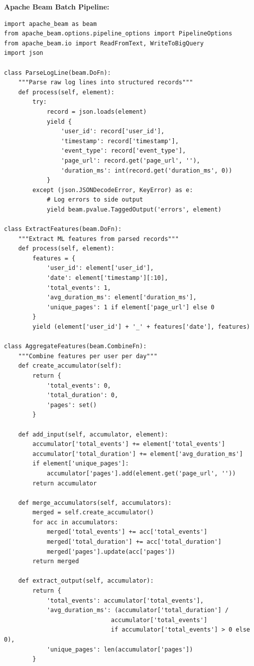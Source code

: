 \textbf{Apache Beam Batch Pipeline:}

\begin{lstlisting}[style=python, caption=Apache Beam batch processing pipeline]
import apache_beam as beam
from apache_beam.options.pipeline_options import PipelineOptions
from apache_beam.io import ReadFromText, WriteToBigQuery
import json

class ParseLogLine(beam.DoFn):
    """Parse raw log lines into structured records"""
    def process(self, element):
        try:
            record = json.loads(element)
            yield {
                'user_id': record['user_id'],
                'timestamp': record['timestamp'],
                'event_type': record['event_type'],
                'page_url': record.get('page_url', ''),
                'duration_ms': int(record.get('duration_ms', 0))
            }
        except (json.JSONDecodeError, KeyError) as e:
            # Log errors to side output
            yield beam.pvalue.TaggedOutput('errors', element)

class ExtractFeatures(beam.DoFn):
    """Extract ML features from parsed records"""
    def process(self, element):
        features = {
            'user_id': element['user_id'],
            'date': element['timestamp'][:10],
            'total_events': 1,
            'avg_duration_ms': element['duration_ms'],
            'unique_pages': 1 if element['page_url'] else 0
        }
        yield (element['user_id'] + '_' + features['date'], features)

class AggregateFeatures(beam.CombineFn):
    """Combine features per user per day"""
    def create_accumulator(self):
        return {
            'total_events': 0,
            'total_duration': 0,
            'pages': set()
        }

    def add_input(self, accumulator, element):
        accumulator['total_events'] += element['total_events']
        accumulator['total_duration'] += element['avg_duration_ms']
        if element['unique_pages']:
            accumulator['pages'].add(element.get('page_url', ''))
        return accumulator

    def merge_accumulators(self, accumulators):
        merged = self.create_accumulator()
        for acc in accumulators:
            merged['total_events'] += acc['total_events']
            merged['total_duration'] += acc['total_duration']
            merged['pages'].update(acc['pages'])
        return merged

    def extract_output(self, accumulator):
        return {
            'total_events': accumulator['total_events'],
            'avg_duration_ms': (accumulator['total_duration'] /
                              accumulator['total_events']
                              if accumulator['total_events'] > 0 else 0),
            'unique_pages': len(accumulator['pages'])
        }


\end{lstlisting}
